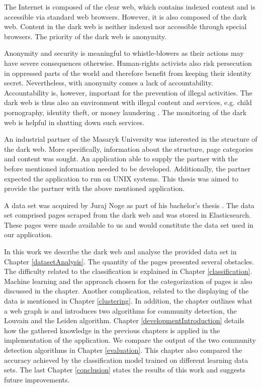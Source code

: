 \label{introduction}
The Internet is composed of the clear web, which contains indexed content and is accessible via standard web browsers. However, it is also composed of the dark web. Content in the dark web is neither indexed nor accessible through special browsers. The priority of the dark web is anonymity.

Anonymity and security is meaningful to whistle-blowers as their actions may have severe consequences otherwise. Human-rights activists also risk persecution in oppressed parts of the world and therefore benefit from keeping their identity secret. Nevertheless, with anonymity comes a lack of accountability. Accountability is, however, important for the prevention of illegal activities. The dark web is thus also an environment with illegal content and services, e.g. child pornography, identity theft, or money laundering \cite{theDarkNet}. The monitoring of the dark web is helpful in shutting down such services.

An industrial partner of the Masaryk University was interested in the structure of the dark web. More specifically, information about the structure, page categories and content was sought. An application able to supply the partner with the before mentioned information needed to be developed. Additionally, the partner expected the application to run on UNIX systems. This thesis was aimed to provide the partner with the above mentioned application. 

A data set was acquired by Juraj Noge as part of his bachelor's thesis \cite{bcScraping}. The data set comprised pages scraped from the dark web and was stored in Elasticsearch. These pages were made available to us and would constitute the data set used in our application.

In this work we describe the dark web and analyse the provided data set in Chapter \ref{datasetAnalysis}. The quantity of the pages presented several obstacles. The difficulty related to the classification is explained in Chapter \ref{classification}. Machine learning and the approach chosen for the categorization of pages is also discussed in the chapter. Another complication, related to the displaying of the data is mentioned in Chapter \ref{clustering}. In addition, the chapter outlines what a web graph is and introduces two algorithms for community detection, the Louvain and the Leiden algorithm. Chapter \ref{developmentIntroduction} details how the gathered knowledge in the previous chapters is applied in the implementation of the application. We compare the output of the two community detection algorithms in Chapter \ref{evaluation}. This chapter also compared the accuracy achieved by the classification model trained on different learning data sets. The last Chapter \ref{conclusion} states the results of this work and suggests future improvements.

